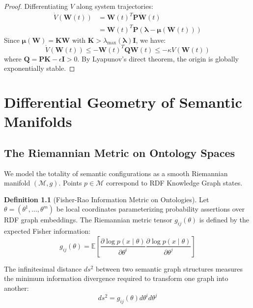 \documentclass[12pt,oneside,a4paper]{book}
\theoremstyle{definition}
\newtheorem{definition}{Definition}[chapter]
\theoremstyle{plain}
\theoremstyle{remark}
\begin{document}
\begin{proof}
Differentiating $V$ along system trajectories:
\begin{align}
    \dot{V}(\mathbf{W}(t)) &= \mathbf{W}(t)^T \mathbf{P} \dot{\mathbf{W}}(t) \nonumber \\
    &= \mathbf{W}(t)^T \mathbf{P} (\boldsymbol{\lambda} - \boldsymbol{\mu}(\mathbf{W}(t)))
\end{align}
Since $\boldsymbol{\mu}(\mathbf{W}) = \mathbf{K} \mathbf{W}$ with $\mathbf{K} > \lambda_{\max}(\boldsymbol{\lambda}) \mathbf{I}$, we have:
\begin{equation}
    \dot{V}(\mathbf{W}(t)) \le -\mathbf{W}(t)^T \mathbf{Q} \mathbf{W}(t) \le -\kappa V(\mathbf{W}(t))
\end{equation}
where $\mathbf{Q} = \mathbf{P}\mathbf{K} - \epsilon \mathbf{I} > 0$. By Lyapunov's direct theorem, the origin is globally exponentially stable.
\end{proof}

\chapter{Differential Geometry of Semantic Manifolds}

\section{The Riemannian Metric on Ontology Spaces}
We model the totality of semantic configurations as a smooth Riemannian manifold $(\mathcal{M}, g)$. Points $p \in \mathcal{M}$ correspond to RDF Knowledge Graph states.

\begin{definition}[Fisher-Rao Information Metric on Ontologies]
Let $\theta = (\theta^1, \dots, \theta^m)$ be local coordinates parameterizing probability assertions over RDF graph embeddings. The Riemannian metric tensor $g_{ij}(\theta)$ is defined by the expected Fisher information:
\begin{equation}
    g_{ij}(\theta) = \mathbb{E}\left[ \frac{\partial \log p(x \mid \theta)}{\partial \theta^i} \frac{\partial \log p(x \mid \theta)}{\partial \theta^j} \right]
\end{equation}
\end{definition}

The infinitesimal distance $ds^2$ between two semantic graph structures measures the minimum information divergence required to transform one graph into another:
\begin{equation}
    ds^2 = g_{ij}(\theta) d\theta^i d\theta^j
\end{equation}
\end{document}
